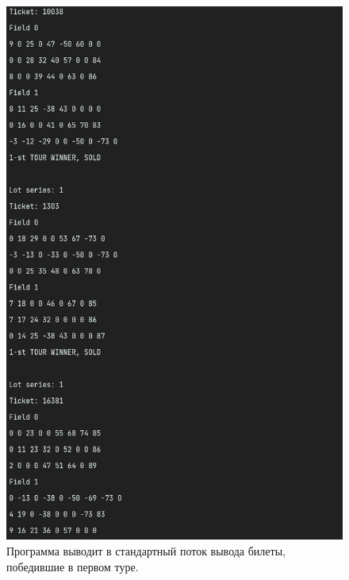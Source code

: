 \documentclass[a4paper,14pt]{article}
\begin{document}
\begin{figure}
  \centering
  \captionsetup{justification=centering,margin=1cm}
  \includegraphics[scale=.95]{pictures/3}
  \caption{Программа выводит в стандартный поток вывода билеты, победившие в первом туре.}
\end{figure}
\end{document}
